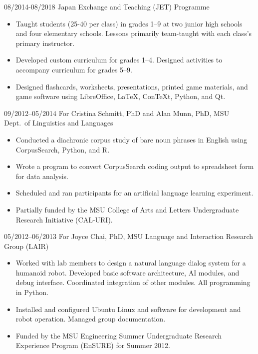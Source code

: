 \documentclass[10pt,oneside]{article}
\begin{document}
\begin{reslist}
		{08/2014-08/2018}
		{Japan Exchange and Teaching (JET) Programme}
		{}
	\begin{itemize}
		\item Taught students (25-40 per class) in grades 1--9 at two junior high schools and four elementary schools. Lessons primarily team-taught with each class's primary instructor.
		\item Developed custom curriculum for grades 1--4. Designed activities to accompany curriculum for grades 5--9.
		\item Designed flashcards, worksheets, presentations, printed game materials, and game software using LibreOffice, LaTeX, ConTeXt, Python, and Qt.
	\end{itemize}

		{09/2012--05/2014}
		{For Cristina Schmitt, PhD and Alan Munn, PhD, MSU Dept.\ of Linguistics and Languages}
		{}
	\begin{itemize}
		\item Conducted a diachronic corpus study of bare noun phrases in English using CorpusSearch, Python, and R.
		\item Wrote a program to convert CorpusSearch coding output to spreadsheet form for data analysis.
		\item Scheduled and ran participants for an artificial language learning experiment.
		\item Partially funded by the MSU College of Arts and Letters Undergraduate Research Initiative (CAL-URI).
	\end{itemize}
	
		{05/2012--06/2013}
		{For Joyce Chai, PhD, MSU Language and Interaction Research Group (LAIR)}
		{}
	\begin{itemize}
		\item Worked with lab members to design a natural language dialog system for a humanoid robot. Developed basic software architecture, AI modules, and debug interface. Coordinated integration of other modules. All programming in Python.
		\item Installed and configured Ubuntu Linux and software for development and robot operation. Managed group documentation.
		\item Funded by the MSU Engineering Summer Undergraduate Research Experience Program (EnSURE) for Summer 2012.
	\end{itemize}
	

\end{reslist}
\end{document}
